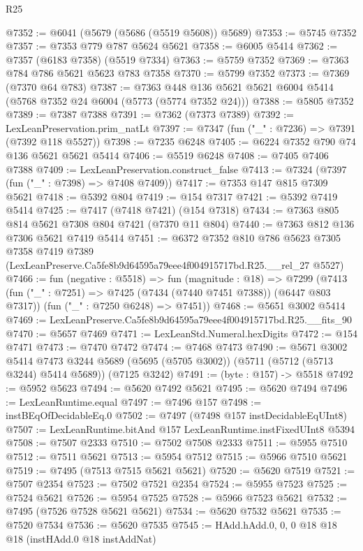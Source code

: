 \begin{lexlean}{R25}
\begin{coremodule}
@7352 := @6041 (@5679 (@5686 (@5519 @5608)) @5689)
@7353 := @5745 @7352
@7357 := @7353 @779 @787 @5624 @5621
@7358 := @6005 @5414
@7362 := @7357 (@6183 @7358) (@5519 @7334)
@7363 := @5759 @7352
@7369 := @7363 @784 @786 @5621 @5623 @783 @7358
@7370 := @5799 @7352
@7373 := @7369 (@7370 @64 @783)
@7387 := @7363 @448 @136 @5621 @5621 @6004 @5414 (@5768 @7352 @24 @6004 (@5773 (@5774 @7352 @24)))
@7388 := @5805 @7352
@7389 := @7387 @7388
@7391 := @7362 (@7373 @7389)
@7392 := LexLeanPreservation.prim_natLt
@7397 := @7347 (fun ("_" : @7236) => @7391 (@7392 @118 @5527))
@7398 := @7235 @6248
@7405 := @6224 @7352 @790 @74 @136 @5621 @5621 @5414
@7406 := @5519 @6248
@7408 := @7405 @7406 @7388
@7409 := LexLeanPreservation.construct_false
@7413 := @7324 (@7397 (fun ("_" : @7398) => @7408 @7409))
@7417 := @7353 @147 @815 @7309 @5621
@7418 := @5392 @804
@7419 := @154 @7317
@7421 := @5392 @7419 @5414
@7425 := @7417 (@7418 @7421) (@154 @7318)
@7434 := @7363 @805 @814 @5621 @7308 @804 @7421 (@7370 @11 @804)
@7440 := @7363 @812 @136 @7306 @5621 @7419 @5414
@7451 := @6372
    @7352
    @810
    @786
    @5623
    @7305
    @7358
    @7419
    @7389
    (LexLeanPreserve.Ca5fe8b9d64595a79eee4f004915717bd.R25.__rel_27 @5527)
@7466 := fun (negative : @5518) =>
  fun (magnitude : @18) =>
  @7299
    (@7413
      (fun ("_" : @7251) => @7425 (@7434 (@7440 @7451 @7388)) (@6447 @803 @7317))
      (fun ("_" : @7250 @6248) => @7451))
@7468 := @5651 @3002 @5414
@7469 := LexLeanPreserve.Ca5fe8b9d64595a79eee4f004915717bd.R25.__fits_90
@7470 := @5657 @7469
@7471 := LexLeanStd.Numeral.hexDigits
@7472 := @154 @7471
@7473 := @7470 @7472
@7474 := @7468 @7473
@7490 := @5671
    @3002
    @5414
    @7473
    @3244
    @5689
    (@5695 (@5705 @3002))
    (@5711 (@5712 (@5713 @3244) @5414 @5689))
    (@7125 @3242)
@7491 := (byte : @157) -> @5518
@7492 := @5952 @5623
@7494 := @5620 @7492 @5621
@7495 := @5620 @7494
@7496 := LexLeanRuntime.equal
@7497 := @7496 @157
@7498 := instBEqOfDecidableEq.{0}
@7502 := @7497 (@7498 @157 instDecidableEqUInt8)
@7507 := LexLeanRuntime.bitAnd @157 LexLeanRuntime.instFixedUInt8 @5394
@7508 := @7507 @2333
@7510 := @7502 @7508 @2333
@7511 := @5955 @7510
@7512 := @7511 @5621
@7513 := @5954 @7512
@7515 := @5966 @7510 @5621
@7519 := @7495 (@7513 @7515 @5621 @5621)
@7520 := @5620 @7519
@7521 := @7507 @2354
@7523 := @7502 @7521 @2354
@7524 := @5955 @7523
@7525 := @7524 @5621
@7526 := @5954 @7525
@7528 := @5966 @7523 @5621
@7532 := @7495 (@7526 @7528 @5621 @5621)
@7534 := @5620 @7532 @5621
@7535 := @7520 @7534
@7536 := @5620 @7535
@7545 := HAdd.hAdd.{0, 0, 0} @18 @18 @18 (instHAdd.{0} @18 instAddNat)

\end{coremodule}
\end{lexlean}

